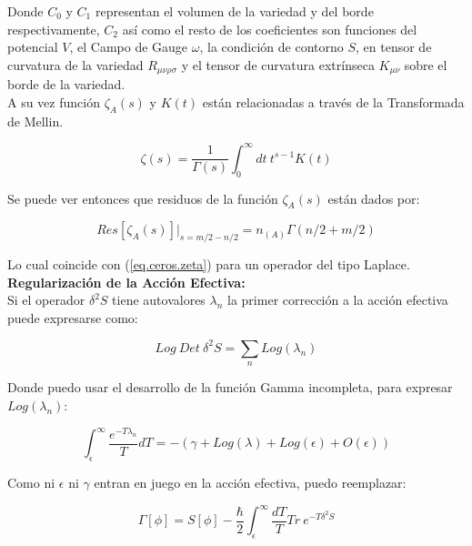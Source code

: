 Donde $C _0$ y $C _1$ representan el volumen de la variedad y del borde respectivamente, $C _2$ así como el resto de los coeficientes son funciones del potencial $V$, el Campo de Gauge $\omega $, la condición de contorno $S$, en tensor de curvatura de la variedad $R _{\mu \nu \rho \sigma }$ y el tensor de curvatura extrínseca $K _{\mu \nu }$ sobre el borde de la variedad. \\

A su vez función $\zeta _A (s) $ y $K(t)$ están relacionadas a través de la Transformada de Mellin.



\begin{equation}
\zeta (s) = \frac{1}{\Gamma (s) } 
\int _0 ^{\infty} dt \
t ^{s-1} K(t) 
\end{equation}

Se puede ver entonces que residuos de la función $\zeta _A (s)$ están dados por:

\begin{equation}
Res[ \zeta _A (s) ] | _{s= m/2 - n/2} =  n _ {(A) } {\Gamma (n/2 + m/2)}
\end{equation}

Lo cual coincide con (\ref{eq.ceros.zeta}) para un operador del tipo Laplace. \\

\textbf{Regularización de la Acción Efectiva:} \\

Si el operador $\delta ^2 S$ tiene autovalores $\lambda _n$ la primer corrección a la acción efectiva puede expresarse como:

\begin{equation}
Log \ Det \ \delta ^2 S = 
\sum _n Log( \lambda _n )
\end{equation}

Donde puedo usar el desarrollo de la función Gamma incompleta, para expresar $Log ( \lambda _n )$:

\begin{equation}
\int _ { \epsilon } ^{\infty} \frac{e ^{- T \lambda _n}}{T} dT =
- \left(
		\gamma + Log ( \lambda  ) + Log ( \epsilon  ) + O ( \epsilon  ) 
		\right)
\end{equation}

Como ni $ \epsilon $ ni $ \gamma $ entran en juego en la acción efectiva, puedo reemplazar:

\begin{equation}
\Gamma [ \phi ] = 
S[ \phi ] - 
\frac{\hbar }{2}
\int _ { \epsilon } ^{\infty} \frac{ dT}{T} Tr \  e ^{- T \delta ^2 S}
\end{equation}

